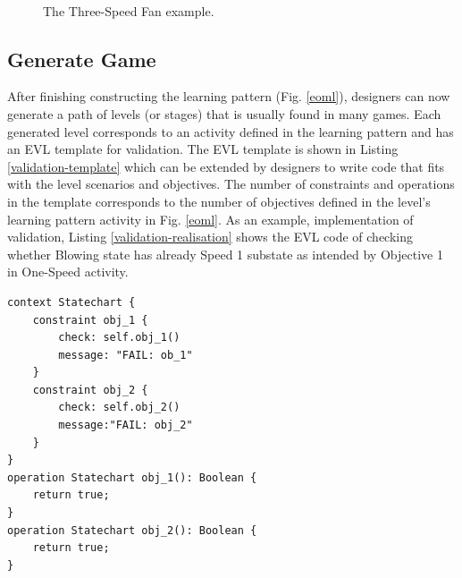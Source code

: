 \documentclass[conference]{IEEEtran}
\begin{document}
\begin{figure}[th]
    \centering
    \\
	\caption{The Three-Speed Fan example.}
    \label{example-03}
\end{figure}


\subsection{Generate Game}
After finishing constructing the learning pattern (Fig. \ref{eoml}), designers can now generate a path of levels (or stages) that is usually found in many games. Each generated level corresponds to an activity defined in the learning pattern and has an EVL template for validation. The EVL template is shown in Listing \ref{validation-template} which can be extended by designers to write code that fits with the level scenarios and objectives. The number of constraints and operations in the template corresponds to the number of objectives defined in the level's learning pattern activity in Fig. \ref{eoml}. As an example, implementation of validation, Listing \ref{validation-realisation} shows the EVL code of checking whether Blowing state has already Speed 1 substate as intended by Objective 1 in One-Speed activity.   

\begin{lstlisting}[caption={Validation template for objectives in One-Speed Fan activity/level.},label=validation-template]
context Statechart {
    constraint obj_1 {
        check: self.obj_1()
        message: "FAIL: ob_1"
    }
    constraint obj_2 {
        check: self.obj_2()
        message:"FAIL: obj_2"
    }        
}
operation Statechart obj_1(): Boolean {
    return true;
}
operation Statechart obj_2(): Boolean {
    return true;
}
\end{lstlisting} 
\end{document}
